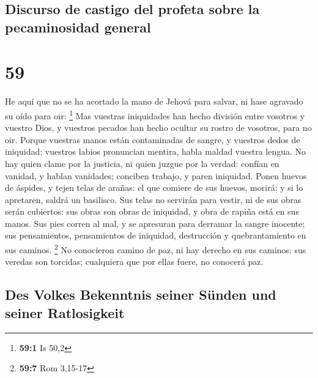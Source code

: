 \hypertarget{discurso-de-castigo-del-profeta-sobre-la-pecaminosidad-general}{%
\subsection{Discurso de castigo del profeta sobre la pecaminosidad
general}\label{discurso-de-castigo-del-profeta-sobre-la-pecaminosidad-general}}

\hypertarget{section-58}{%
\section{59}\label{section-58}}

 He aquí que no se ha acortado la mano de Jehová para
salvar, ni hase agravado su oído para oir: \footnote{\textbf{59:1} Is
  50,2}  Mas vuestras iniquidades han hecho división entre
vosotros y vuestro Dios, y vuestros pecados han hecho ocultar su rostro
de vosotros, para no oir.  Porque vuestras manos están
contaminadas de sangre, y vuestros dedos de iniquidad; vuestros labios
pronuncian mentira, habla maldad vuestra lengua.  No hay
quien clame por la justicia, ni quien juzgue por la verdad: confían en
vanidad, y hablan vanidades; conciben trabajo, y paren iniquidad.
 Ponen huevos de áspides, y tejen telas de arañas: el que
comiere de sus huevos, morirá; y si lo apretaren, saldrá un basilisco.
 Sus telas no servirán para vestir, ni de sus obras serán
cubiertos: sus obras son obras de iniquidad, y obra de rapiña está en
sus manos.  Sus pies corren al mal, y se apresuran para
derramar la sangre inocente; sus pensamientos, pensamientos de
iniquidad, destrucción y quebrantamiento en sus caminos. \footnote{\textbf{59:7}
  Rom 3,15-17}  No conocieron camino de paz, ni hay derecho
en sus caminos: sus veredas son torcidas; cualquiera que por ellas
fuere, no conocerá paz.

\hypertarget{des-volkes-bekenntnis-seiner-suxfcnden-und-seiner-ratlosigkeit}{%
\subsection{Des Volkes Bekenntnis seiner Sünden und seiner
Ratlosigkeit}\label{des-volkes-bekenntnis-seiner-suxfcnden-und-seiner-ratlosigkeit}}

